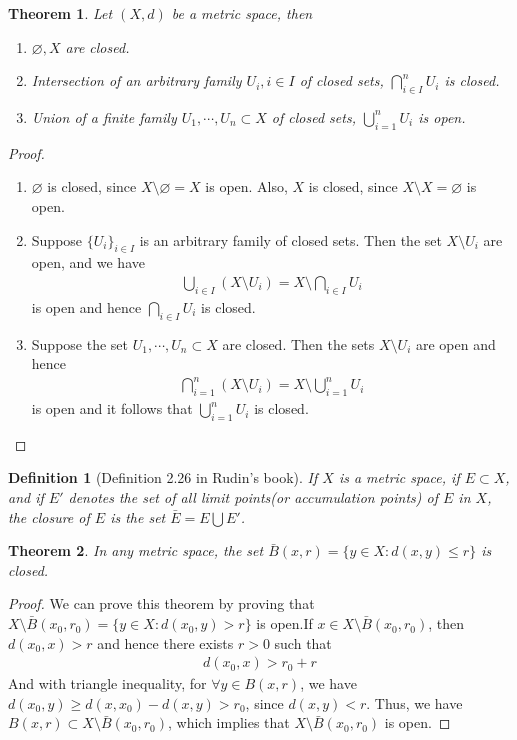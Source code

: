 \documentclass[12pt,leqno]{amsart}
\newtheorem{definition}{Definition}[section]
\newtheorem{theorem}{Theorem}[section]
\theoremstyle{definition}
\numberwithin{equation}{subsection}
\begin{document}
\medskip

\begin{theorem}
Let $(X,d)$ be a metric space, then
\begin{enumerate}
    \item $\varnothing, X$ are closed.
    \item Intersection of an arbitrary family $U_i,i\in I$ of closed sets, $\bigcap^n_{i\in I}U_i$ is closed.
    \item Union of a finite family $U_1, \cdots, U_n \subset X$ of closed sets, $\bigcup^n_{i=1}U_i$ is open.
\end{enumerate}
\end{theorem}
\begin{proof}
~\begin{enumerate}
    \item $\varnothing$ is closed, since $X\setminus \varnothing = X$ is open. Also, $X$ is closed, since $X\setminus X = \varnothing$ is open.
    \item Suppose $\{U_i\}_{i\in I}$ is an arbitrary family of closed sets. Then the set $X\setminus U_i$ are open, and we have 
    \begin{align*}
        \bigcup_{i\in I} (X\setminus U_i) = X \setminus \bigcap_{i\in I} U_i
    \end{align*}
    is open and hence $\bigcap_{i\in I} U_i$ is closed.
    \item Suppose the set $U_1, \cdots, U_n \subset X$ are closed. Then the sets $X\setminus U_i$ are open and hence
    \begin{align*}
        \bigcap^n_{i=1} (X\setminus U_i) = X \setminus \bigcup^n_{i=1} U_i
    \end{align*}
    is open and it follows that $\bigcup^n_{i=1} U_i$ is closed.
\end{enumerate}
\end{proof}

\begin{definition}[Definition 2.26 in Rudin's book]
If $X$ is a metric space, if $E\subset X$, and if $E'$ denotes the set of all limit points(or accumulation points) of $E$ in $X$, the closure of $E$ is the set $\bar{E} = E \bigcup E'$.
\end{definition}

\medskip

\begin{theorem}
In any metric space, the set $\bar{B}(x,r) = \{y\in X: d(x,y)\leq r\}$ is closed.
\end{theorem}
\begin{proof}
We can prove this theorem by proving that $X\setminus \bar{B}(x_0,r_0) = \{y\in X: d(x_0,y) > r\}$ is open.If $x\in X\setminus\bar{B}(x_0,r_0)$, then $d(x_0,x) > r$ and hence there exists $r > 0$ such that
\begin{align*}
    d(x_0,x) > r_0 + r
\end{align*}
And with triangle inequality, for $\forall y\in B(x,r)$, we have $d(x_0,y) \geq d(x,x_0) - d(x,y) > r_0$, since $d(x,y) < r$. Thus, we have $B(x,r)\subset X\setminus \bar{B}(x_0,r_0)$, which implies that $X\setminus \bar{B}(x_0,r_0)$ is open.
\end{proof}
\end{document}
